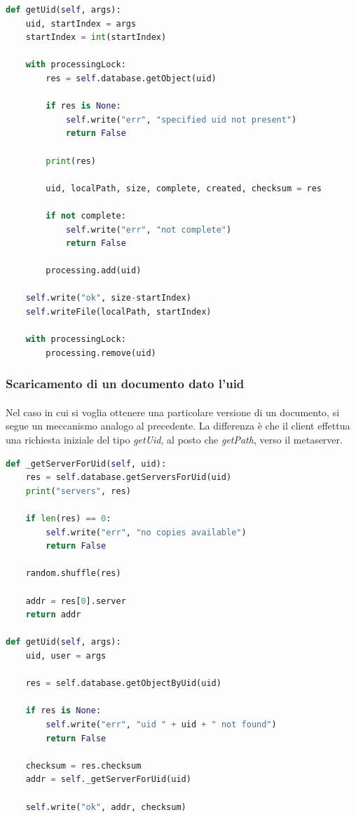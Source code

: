 \documentclass{article}
\begin{document}
\begin{lstlisting}[language=Python, title=Codice]
def getUid(self, args):
    uid, startIndex = args
    startIndex = int(startIndex)

    with processingLock:
        res = self.database.getObject(uid)

        if res is None:
            self.write("err", "specified uid not present")
            return False

        print(res)

        uid, localPath, size, complete, created, checksum = res

        if not complete:
            self.write("err", "not complete")
            return False

        processing.add(uid)

    self.write("ok", size-startIndex)
    self.writeFile(localPath, startIndex)

    with processingLock:
        processing.remove(uid)
\end{lstlisting}

\subsubsection{Scaricamento di un documento dato l'uid}

\paragraph{} Nel caso in cui si voglia ottenere una particolare versione di un documento, si segue un meccanismo analogo al precedente. La differenza è che il client effettua una richiesta iniziale del tipo \emph{getUid}, al posto che \emph{getPath}, verso il metaserver. 

\begin{lstlisting}[language=Python, title=Metaserver]
def _getServerForUid(self, uid):
    res = self.database.getServersForUid(uid)
    print("servers", res)

    if len(res) == 0:
        self.write("err", "no copies available")
        return False

    random.shuffle(res)

    addr = res[0].server
    return addr

def getUid(self, args):
    uid, user = args

    res = self.database.getObjectByUid(uid)

    if res is None:
        self.write("err", "uid " + uid + " not found")
        return False

    checksum = res.checksum
    addr = self._getServerForUid(uid)

    self.write("ok", addr, checksum)
\end{lstlisting}
\end{document}
